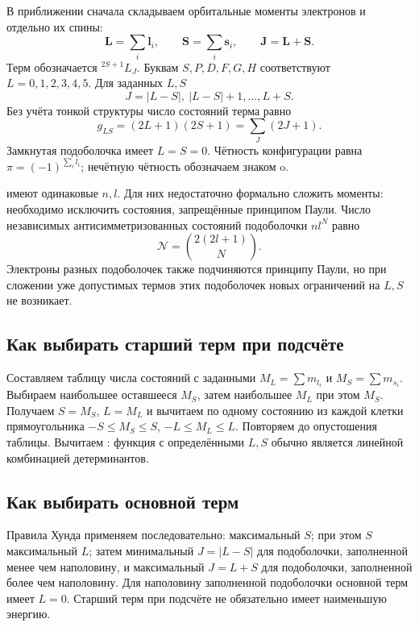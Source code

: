 \documentclass[../final.tex]{subfiles}
\begin{document}

\begingroup
\renewcommand{\thesection}{4.\arabic{section}}


В приближении  сначала складываем орбитальные
моменты электронов и отдельно их спины:
\[
    \mathbf L=\sum_i\mathbf l_i,\qquad
    \mathbf S=\sum_i\mathbf s_i,\qquad
    \mathbf J=\mathbf L+\mathbf S.
\]
Терм обозначается ${}^{2S+1}L_J$. Буквам $S,P,D,F,G,H$
соответствуют $L=0,1,2,3,4,5$. Для заданных $L,S$
\[
    J=|L-S|,\ |L-S|+1,\ldots,L+S.
\]
Без учёта тонкой структуры число состояний терма равно
\[
    g_{LS}=(2L+1)(2S+1)=\sum_J(2J+1).
\]
Замкнутая подоболочка имеет $L=S=0$. Чётность конфигурации равна
$\pi=(-1)^{\sum_i l_i}$; нечётную чётность обозначаем знаком $\mathrm{o}$.

 имеют одинаковые $n,l$.
Для них недостаточно формально сложить моменты: необходимо исключить
состояния, запрещённые принципом Паули. Число независимых
антисимметризованных состояний подоболочки $nl^N$ равно
\[
    \mathcal N=\binom{2(2l+1)}{N}.
\]
Электроны разных подоболочек также подчиняются принципу Паули,
но при сложении уже допустимых термов этих подоболочек новых
ограничений на $L,S$ не возникает.

\subsection*{Как выбирать старший терм при подсчёте}
Составляем таблицу числа состояний с заданными
$M_L=\sum m_{l_i}$ и $M_S=\sum m_{s_i}$.
Выбираем наибольшее оставшееся $M_S$, затем наибольшее $M_L$
при этом $M_S$. Получаем $S=M_S$, $L=M_L$ и вычитаем по одному
состоянию из каждой клетки прямоугольника
$-S\leq M_S\leq S$, $-L\leq M_L\leq L$. Повторяем до опустошения таблицы.
Вычитаем : функция с определёнными $L,S$
обычно является линейной комбинацией детерминантов.

\subsection*{Как выбирать основной терм}
Правила Хунда применяем последовательно: максимальный $S$;
при этом $S$ максимальный $L$; затем минимальный $J=|L-S|$
для подоболочки, заполненной менее чем наполовину, и максимальный
$J=L+S$ для подоболочки, заполненной более чем наполовину.
Для наполовину заполненной подоболочки основной терм имеет $L=0$.
Старший терм при подсчёте не обязательно имеет наименьшую энергию.
\end{document}
